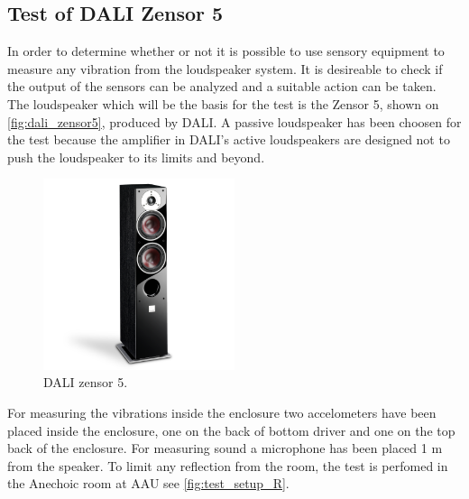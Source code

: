 \subsection{Test of DALI Zensor 5}
In order to determine whether or not it is possible to use sensory equipment to measure any vibration from the loudspeaker system. It is desireable to check if the output of the sensors can be analyzed and a suitable action can be taken. The loudspeaker which will be the basis for the test is the Zensor 5, shown on \autoref{fig:dali_zensor5}, produced by DALI. A passive loudspeaker has been choosen for the test because the amplifier in DALI's active loudspeakers are designed not to push the loudspeaker to its limits and beyond. %

\begin{figure}[H]
\centering
\includegraphics[width=0.5\textwidth]{figures/zensor5.png}
\caption{DALI zensor 5.}
\label{fig:dali_zensor5}
\end{figure}


For measuring the vibrations inside the enclosure two accelometers have been placed inside the enclosure, one on the back of bottom driver and one on the top back of the enclosure. For measuring sound a microphone has been placed 1 m from the speaker. To limit any reflection from the room, the test is perfomed in the Anechoic room at \gls{AAU} see \ref{fig:test_setup_R}.  



